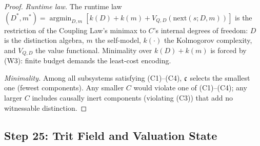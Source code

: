 \begin{proof}
\emph{Runtime law.}  The runtime law
$(D^*, m^*) = \operatorname*{argmin}_{D, m}
[k(D) + k(m) + V_{Q,D}(\mathrm{next}(s; D, m))]$
is the restriction of the Coupling Law's minimax to $C$'s internal
degrees of freedom: $D$ is the distinction algebra, $m$ the self-model,
$k(\cdot)$ the Kolmogorov complexity, and $V_{Q,D}$ the value functional.
Minimality over $k(D) + k(m)$ is forced by (W3): finite budget demands
the least-cost encoding.

\emph{Minimality.} Among all subsystems satisfying (C1)--(C4), $\mathfrak{c}$
selects the smallest one (fewest components).  Any smaller $C$ would violate
one of (C1)--(C4); any larger $C$ includes causally inert components
(violating (C3)) that add no witnessable distinction.

\end{proof}


\subsection{Step 25: Trit Field and Valuation State}\label{app:step25-new}

